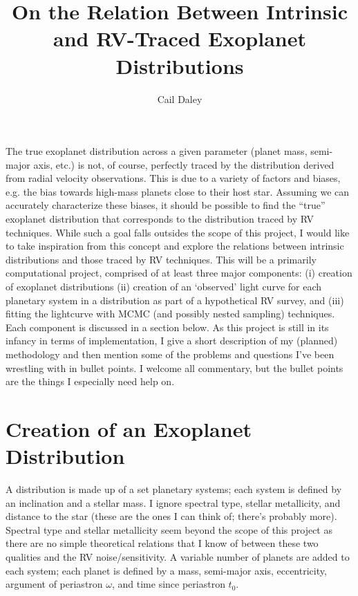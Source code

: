 \documentclass[12pt,modern]{article}
\author{Cail Daley}
\title{On the Relation Between Intrinsic and RV-Traced Exoplanet Distributions}
\begin{document}
\maketitle

The true exoplanet distribution across a given parameter (planet mass, semi-major axis, etc.)  is not, of course, perfectly traced by the distribution derived from radial velocity observations. 
This is due to a variety of factors and biases, e.g. the bias towards high-mass planets close to their host star. 
Assuming we can accurately characterize these biases, it should be possible to find the “true” exoplanet distribution that corresponds to the distribution traced by RV techniques. 
While such a goal falls outsides the scope of this project, I would like to take inspiration from this concept and explore the relations between intrinsic distributions and those traced by RV techniques. 
This will be a primarily computational project, comprised of at least three major components: (i) creation of exoplanet distributions (ii) creation of an `observed' light curve for each planetary system in a distribution as part of a hypothetical RV survey, and (iii) fitting the lightcurve with MCMC (and possibly nested sampling) techniques. 
Each component is discussed in a section below.
As this project is still in its infancy in terms of implementation, I give a short description of my (planned) methodology and then mention some of the problems and questions I've been wrestling with in bullet points. I welcome all commentary, but the bullet points are the things I especially need help on.

\section{Creation of an Exoplanet Distribution}
\label{sec: (1)}
A distribution is made up of a set planetary systems; each system is defined by an inclination and a stellar mass. 
I ignore spectral type, stellar metallicity, and distance to the star (these are the ones I can think of; there's probably more). 
Spectral type and stellar metallicity seem beyond the scope of this project as there are no simple theoretical relations that I know of between these two qualities and the RV noise/sensitivity. 
A variable number of planets are added to each system; each planet is defined by a mass, semi-major axis, eccentricity, argument of periastron $\omega$, and time since periastron $t_0$.
\end{document}
